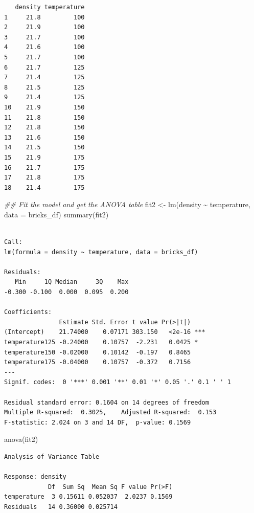 \documentclass[
  letterpaper,
]{scrbook}
\newenvironment{Shaded}{\begin{snugshade}}{\end{snugshade}}
\newcommand{\AttributeTok}[1]{\textcolor[rgb]{0.40,0.45,0.13}{#1}}
\newcommand{\DocumentationTok}[1]{\textcolor[rgb]{0.37,0.37,0.37}{\textit{#1}}}
\newcommand{\FunctionTok}[1]{\textcolor[rgb]{0.28,0.35,0.67}{#1}}
\newcommand{\NormalTok}[1]{\textcolor[rgb]{0.00,0.23,0.31}{#1}}
\newcommand{\OtherTok}[1]{\textcolor[rgb]{0.00,0.23,0.31}{#1}}
\newcommand{\SpecialCharTok}[1]{\textcolor[rgb]{0.37,0.37,0.37}{#1}}
\begin{document}
\begin{verbatim}
   density temperature
1     21.8         100
2     21.9         100
3     21.7         100
4     21.6         100
5     21.7         100
6     21.7         125
7     21.4         125
8     21.5         125
9     21.4         125
10    21.9         150
11    21.8         150
12    21.8         150
13    21.6         150
14    21.5         150
15    21.9         175
16    21.7         175
17    21.8         175
18    21.4         175
\end{verbatim}

\begin{Shaded}
\begin{Highlighting}[]
\DocumentationTok{\#\# Fit the model and get the ANOVA table}
\NormalTok{fit2 }\OtherTok{\textless{}{-}} \FunctionTok{lm}\NormalTok{(density }\SpecialCharTok{\textasciitilde{}}\NormalTok{ temperature, }\AttributeTok{data =}\NormalTok{ bricks\_df)}
\FunctionTok{summary}\NormalTok{(fit2)}
\end{Highlighting}
\end{Shaded}

\begin{verbatim}

Call:
lm(formula = density ~ temperature, data = bricks_df)

Residuals:
   Min     1Q Median     3Q    Max 
-0.300 -0.100  0.000  0.095  0.200 

Coefficients:
               Estimate Std. Error t value Pr(>|t|)    
(Intercept)    21.74000    0.07171 303.150   <2e-16 ***
temperature125 -0.24000    0.10757  -2.231   0.0425 *  
temperature150 -0.02000    0.10142  -0.197   0.8465    
temperature175 -0.04000    0.10757  -0.372   0.7156    
---
Signif. codes:  0 '***' 0.001 '**' 0.01 '*' 0.05 '.' 0.1 ' ' 1

Residual standard error: 0.1604 on 14 degrees of freedom
Multiple R-squared:  0.3025,    Adjusted R-squared:  0.153 
F-statistic: 2.024 on 3 and 14 DF,  p-value: 0.1569
\end{verbatim}

\begin{Shaded}
\begin{Highlighting}[]
\FunctionTok{anova}\NormalTok{(fit2)}
\end{Highlighting}
\end{Shaded}

\begin{verbatim}
Analysis of Variance Table

Response: density
            Df  Sum Sq  Mean Sq F value Pr(>F)
temperature  3 0.15611 0.052037  2.0237 0.1569
Residuals   14 0.36000 0.025714               
\end{verbatim}
\end{document}
